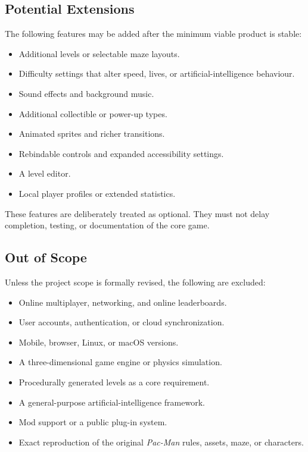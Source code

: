 \subsection{Potential Extensions}

The following features may be added after the minimum viable product is stable:

\begin{itemize}
	\item Additional levels or selectable maze layouts.
	\item Difficulty settings that alter speed, lives, or artificial-intelligence behaviour.
	\item Sound effects and background music.
	\item Additional collectible or power-up types.
	\item Animated sprites and richer transitions.
	\item Rebindable controls and expanded accessibility settings.
	\item A level editor.
	\item Local player profiles or extended statistics.
\end{itemize}

These features are deliberately treated as optional. They must not delay completion, testing, or documentation of the core game.

\subsection{Out of Scope}

Unless the project scope is formally revised, the following are excluded:

\begin{itemize}
	\item Online multiplayer, networking, and online leaderboards.
	\item User accounts, authentication, or cloud synchronization.
	\item Mobile, browser, Linux, or macOS versions.
	\item A three-dimensional game engine or physics simulation.
	\item Procedurally generated levels as a core requirement.
	\item A general-purpose artificial-intelligence framework.
	\item Mod support or a public plug-in system.
	\item Exact reproduction of the original \emph{Pac-Man} rules, assets, maze, or characters.
\end{itemize}

